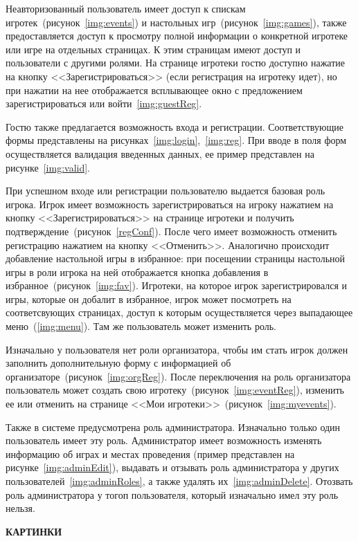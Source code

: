 Неавторизованный пользователь имеет доступ к спискам
игротек~(рисунок~\ref{img:events}) и настольных игр~(рисунок~\ref{img:games}),
также предоставляется доступ к просмотру полной информации о конкретной игротеке
или игре на отдельных страницах. К этим страницам имеют доступ и пользователи с
другими ролями. На странице игротеки гостю доступно нажатие на кнопку
<<Зарегистрироваться>> (если регистрация на игротеку идет), но при нажатии на
нее отображается всплывающее окно с предложением зарегистрироваться или
войти~\ref{img:guestReg}.

Гостю также предлагается возможность входа и регистрации. Соответствующие формы
представлены на рисунках~\ref{img:login},~\ref{img:reg}. При вводе в поля форм
осуществляется валидация введенных данных, ее пример представлен на
рисунке~\ref{img:valid}.

При успешном входе или регистрации пользователю выдается базовая роль игрока.
Игрок имеет возможность зарегистрироваться на игроку нажатием на кнопку
<<Зарегистрироваться>> на странице игротеки и получить
подтверждение~(рисунок~\ref{regConf}). После чего имеет возможность отменить
регистрацию нажатием на кнопку <<Отменить>>. Аналогично происходит добавление
настольной игры в избранное: при посещении страницы настольной игры в роли
игрока на ней отображается кнопка добавления в
избранное~(рисунок~\ref{img:fav}). Игротеки, на которое игрок зарегистрировался
и игры, которые он добалит в избранное, игрок может посмотреть на соответсвующих
страницах, доступ к которым осуществляется через выпадающее
меню~(\ref{img:menu}). Там же пользователь может изменить роль.

Изначально у пользователя нет роли организатора, чтобы им стать игрок должен
заполнить дополнительную форму с информацией об
организаторе~(рисунок~\ref{img:orgReg}). После переключения на роль организатора
пользователь может создать свою игротеку~(рисунок~\ref{img:eventReg}), изменить
ее или отменить на странице <<Мои игротеки>>~(рисунок~\ref{img:myevents}).

Также в системе предусмотрена роль администратора. Изначально только один
пользователь имеет эту роль. Администратор имеет возможность изменять информацию
об играх и местах проведения (пример представлен на
рисунке~\ref{img:adminEdit}), выдавать и отзывать роль администратора у других
пользователей~\ref{img:adminRoles}, а также удалять их~\ref{img:adminDelete}.
Отозвать роль администратора у тогоп пользователя, который изначально имел эту
роль нельзя.

\textbf{КАРТИНКИ}
